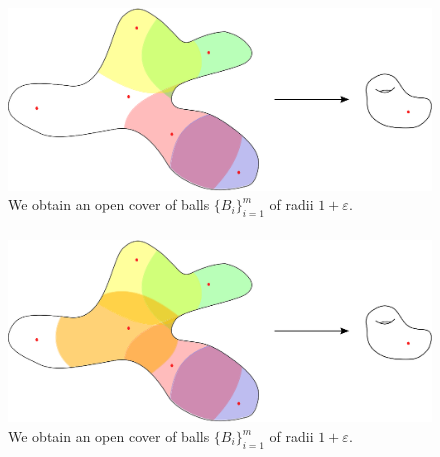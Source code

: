 \documentclass{beamer}
\begin{document}
\begin{frame}\frametitle{}

\begin{figure}
\centering
\includegraphics[scale=0.6]{Nerving7.eps}
\caption{We obtain an open cover of balls $\{ B_i \}_{i=1}^m$ of radii $1+\varepsilon$.}
\end{figure}


\end{frame}


\begin{frame}\frametitle{}

\begin{figure}
\centering
\includegraphics[scale=0.6]{Nerving8.eps}
\caption{We obtain an open cover of balls $\{ B_i \}_{i=1}^m$ of radii $1+\varepsilon$.}
\end{figure}


\end{frame}
\end{document}
